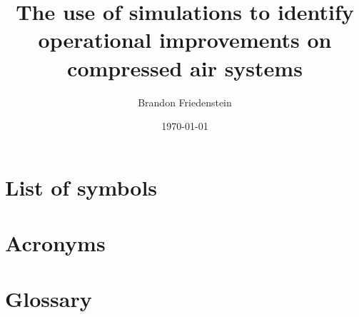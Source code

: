\documentclass[12pt, english, oneside, singlespacing, open=any]{report}
\begin{document}
	
\begin{titlepage}
	\title{The use of simulations to identify
		operational improvements on compressed
		air systems}
	\date{\today}
	\author{Brandon Friedenstein}
	\maketitle
\end{titlepage}

\begin{abstract}
	\thispagestyle{plain}
	\setcounter{page}{2}
\end{abstract}

\setcounter{page}{3}
\tableofcontents



\chapter*{List of symbols}

\chapter*{Acronyms}

\chapter*{Glossary}







\end{document}
